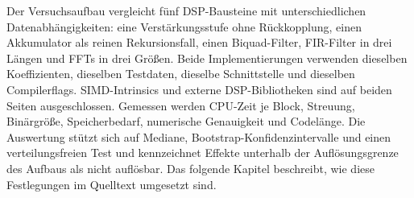 Der Versuchsaufbau vergleicht fünf DSP-Bausteine mit unterschiedlichen
Datenabhängigkeiten: eine Verstärkungsstufe ohne Rückkopplung, einen
Akkumulator als reinen Rekursionsfall, einen Biquad-Filter, FIR-Filter in drei
Längen und FFTs in drei Größen. Beide Implementierungen verwenden dieselben
Koeffizienten, dieselben Testdaten, dieselbe Schnittstelle und dieselben
Compilerflags. SIMD-Intrinsics und externe DSP-Bibliotheken sind auf beiden
Seiten ausgeschlossen. Gemessen werden CPU-Zeit je Block, Streuung,
Binärgröße, Speicherbedarf, numerische Genauigkeit und Codelänge. Die
Auswertung stützt sich auf Mediane, Bootstrap-Konfidenzintervalle und einen
verteilungsfreien Test und kennzeichnet Effekte unterhalb der
Auflösungsgrenze des Aufbaus als nicht auflösbar. Das folgende Kapitel
beschreibt, wie diese Festlegungen im Quelltext umgesetzt sind.